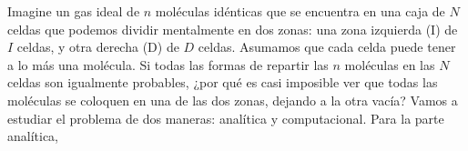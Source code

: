 Imagine un gas ideal de $n$ moléculas idénticas que se encuentra en una caja de $N$ celdas que podemos dividir mentalmente en dos zonas: una zona izquierda (I) de $I$ celdas, y otra derecha (D) de $D$ celdas. Asumamos que cada celda puede tener a lo más una molécula. Si todas las formas de repartir las $n$ moléculas en las $N$ celdas son igualmente probables, ¿por qué es casi imposible ver que todas las moléculas se coloquen en una de las dos zonas, dejando a la otra vacía? Vamos a estudiar el problema de dos maneras: analítica y computacional.
Para la parte analítica,


